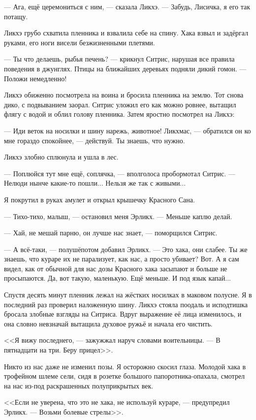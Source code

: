 --- Ага, ещё церемониться с ним, --- сказала Ликхэ.
--- Забудь, Лисичка, я его так потащу.

Ликхэ грубо схватила пленника и взвалила себе на спину.
Хака взвыл и задёргал руками, его ноги висели безжизненными плетями.

--- Ты что делаешь, рыбья печень? --- крикнул Ситрис, нарушая все правила поведения в джунглях.
Птицы на ближайших деревьях подняли дикий гомон.
--- Положи немедленно!

Ликхэ обиженно посмотрела на воина и бросила пленника на землю.
Тот снова дико, с подвыванием заорал.
Ситрис уложил его как можно ровнее, вытащил флягу с водой и облил голову пленника.
Затем яростно посмотрел на Ликхэ:

--- Иди веток на носилки и шину нарежь, животное!
Ликхмас, --- обратился он ко мне гораздо спокойнее, --- действуй.
Ты знаешь, что нужно.

Ликхэ злобно сплюнула и ушла в лес.

--- Поплюйся тут мне ещё, соплячка, --- вполголоса пробормотал Ситрис.
--- Нелюди нынче какие-то пошли...
Нельзя же так с живыми...

Я покрутил в руках амулет и открыл крышечку Красного Сана.

--- Тихо-тихо, малыш, --- остановил меня Эрликх.
--- Меньше каплю делай.

--- Хай, не мешай парню, он лучше нас знает, --- поморщился Ситрис.

--- А всё-таки, --- полушёпотом добавил Эрликх.
--- Это хака, они слабее.
Ты же знаешь, что кураре их не парализует, как нас, а просто убивает?
Вот.
А я сам видел, как от обычной для нас дозы Красного хака засыпают и больше не просыпаются.
Да, вот такую, маленькую.
Ещё меньше.
И под язык капай...

Спустя десять минут пленник лежал на жёстких носилках в маковом полусне.
Я в последний раз проверил наложенную шину.
Ликхэ стояла поодаль и исподтишка бросала злобные взгляды на Ситриса.
Вдруг выражение её лица изменилось, и она словно невзначай вытащила духовое ружьё и начала его чистить.

<<Я вижу последнего, --- зажужжал наруч словами воительницы.
--- В пятнадцати на три.
Беру прицел>>.

Никто из нас даже не изменил позы.
Я осторожно скосил глаза.
Молодой хака в трофейном шлеме сели, сидя в розетке большого папоротника-опахала, смотрел на нас из-под раскрашенных полуприкрытых век.

<<Если не уверена, что это не хака, не используй кураре, --- предупредил Эрликх.
--- Возьми болевые стрелы>>.

